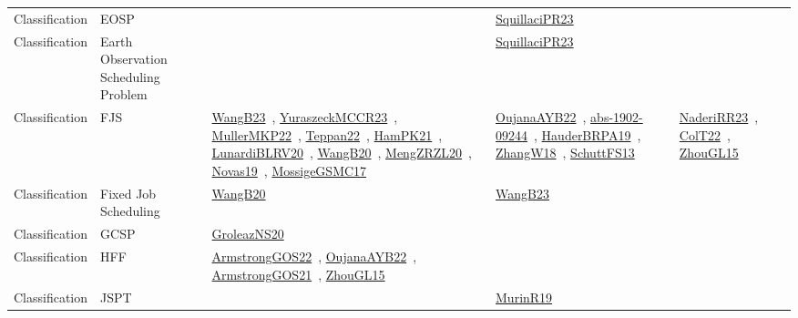 {\begin{longtable}{lp{3cm}>{\raggedright\arraybackslash}p{6cm}>{\raggedright\arraybackslash}p{6cm}>{\raggedright\arraybackslash}p{8cm}}
Classification & EOSP &  & \href{papers/SquillaciPR23.pdf}{SquillaciPR23}~\cite{SquillaciPR23} & \\
Classification & Earth Observation Scheduling Problem &  & \href{papers/SquillaciPR23.pdf}{SquillaciPR23}~\cite{SquillaciPR23} & \\
Classification & FJS & \href{papers/WangB23.pdf}{WangB23}~\cite{WangB23}, \href{articles/YuraszeckMCCR23.pdf}{YuraszeckMCCR23}~\cite{YuraszeckMCCR23}, \href{articles/MullerMKP22.pdf}{MullerMKP22}~\cite{MullerMKP22}, \href{papers/Teppan22.pdf}{Teppan22}~\cite{Teppan22}, \href{articles/HamPK21.pdf}{HamPK21}~\cite{HamPK21}, \href{articles/LunardiBLRV20.pdf}{LunardiBLRV20}~\cite{LunardiBLRV20}, \href{papers/WangB20.pdf}{WangB20}~\cite{WangB20}, \href{articles/MengZRZL20.pdf}{MengZRZL20}~\cite{MengZRZL20}, \href{articles/Novas19.pdf}{Novas19}~\cite{Novas19}, \href{papers/MossigeGSMC17.pdf}{MossigeGSMC17}~\cite{MossigeGSMC17} & \href{papers/OujanaAYB22.pdf}{OujanaAYB22}~\cite{OujanaAYB22}, \href{articles/abs-1902-09244.pdf}{abs-1902-09244}~\cite{abs-1902-09244}, \href{articles/HauderBRPA19.pdf}{HauderBRPA19}~\cite{HauderBRPA19}, \href{articles/ZhangW18.pdf}{ZhangW18}~\cite{ZhangW18}, \href{papers/SchuttFS13.pdf}{SchuttFS13}~\cite{SchuttFS13} & \href{articles/NaderiRR23.pdf}{NaderiRR23}~\cite{NaderiRR23}, \href{articles/ColT22.pdf}{ColT22}~\cite{ColT22}, \href{papers/ZhouGL15.pdf}{ZhouGL15}~\cite{ZhouGL15}\\
Classification & Fixed Job Scheduling & \href{papers/WangB20.pdf}{WangB20}~\cite{WangB20} & \href{papers/WangB23.pdf}{WangB23}~\cite{WangB23} & \\
Classification & GCSP & \href{papers/GroleazNS20.pdf}{GroleazNS20}~\cite{GroleazNS20} &  & \\
Classification & HFF & \href{papers/ArmstrongGOS22.pdf}{ArmstrongGOS22}~\cite{ArmstrongGOS22}, \href{papers/OujanaAYB22.pdf}{OujanaAYB22}~\cite{OujanaAYB22}, \href{papers/ArmstrongGOS21.pdf}{ArmstrongGOS21}~\cite{ArmstrongGOS21}, \href{papers/ZhouGL15.pdf}{ZhouGL15}~\cite{ZhouGL15} &  & \\
Classification & JSPT &  & \href{papers/MurinR19.pdf}{MurinR19}~\cite{MurinR19} & \\

\end{longtable}}
